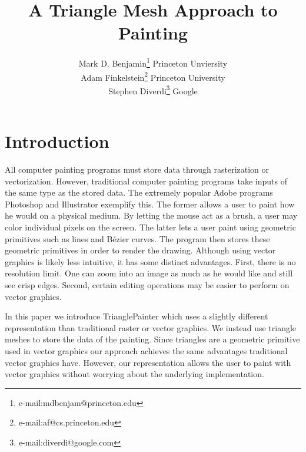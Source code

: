 \documentclass[conference]{acmsiggraph}
\title{A Triangle Mesh Approach to Painting}
\author{Mark D. Benjamin\thanks{e-mail:mdbenjam@princeton.edu} \hspace{10 pt} Princeton Unviersity\\ Adam Finkelstein\thanks{e-mail:af@cs.princeton.edu} \hspace{10 pt} Princeton University\\ Stephen Diverdi\thanks{e-mail:diverdi@google.com} \hspace{10 pt} Google}
\begin{document}

\maketitle

\begin{abstract}



\end{abstract}

\begin{CRcatlist}
\end{CRcatlist}

\keywordlist


\TOGlinkslist


\copyrightspace

\section{Introduction}

All computer painting programs must store data through rasterization or vectorization. 
However, traditional computer painting programs take inputs of the same type as the stored data. The 
extremely popular Adobe programs Photoshop and Illustrator exemplify this. The former
allows a user to paint how he would on a physical medium. By letting the mouse act as
a brush, a user may color individual pixels on the screen. The latter lets a user paint
using geometric primitives such as lines and B\'{e}zier curves. The program then stores
these geometric primitives in order to render the drawing. Although using vector graphics
is likely less intuitive, it has some distinct advantages. First, there is no resolution
limit. One can zoom into an image as much as he would like and still see crisp edges.
Second, certain editing operations may be easier to perform on vector graphics.

In this paper we introduce TrianglePainter which  
uses a slightly different representation than traditional raster or vector graphics.
We instead use triangle meshes to store the data of the painting.
Since triangles are a geometric primitive used in vector graphics our approach achieves the
same advantages traditional vector graphics have. However, our representation allows the
user to paint with vector graphics without worrying about the underlying implementation.
\end{document}
